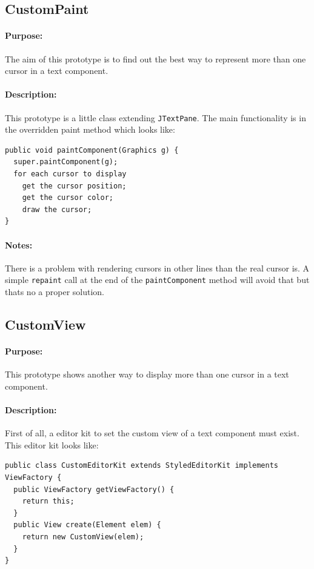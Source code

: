 \documentclass[11pt,a4paper]{article}
\begin{document}
\subsection{CustomPaint}
\paragraph{Purpose:}
The aim of this prototype is to find out the best way to represent more than one cursor in a text component.
\paragraph{Description:}
This prototype is a little class extending \texttt{JTextPane}. The main functionality is in the overridden paint method which looks like:
\begin{verbatim}
public void paintComponent(Graphics g) {
  super.paintComponent(g);
  for each cursor to display
    get the cursor position;
    get the cursor color;
    draw the cursor;
}
\end{verbatim}
\paragraph{Notes:}
There is a problem with rendering cursors in other lines than the real cursor is. A simple \texttt{repaint} call at the end of the \texttt{paintComponent} method will avoid that but thats no a proper solution.



\subsection{CustomView}
\paragraph{Purpose:}
This prototype shows another way to display more than one cursor in a text component.
\paragraph{Description:}

First of all, a editor kit to set the custom view of a text component must exist. This editor kit looks like:
\begin{verbatim}
public class CustomEditorKit extends StyledEditorKit implements ViewFactory {
  public ViewFactory getViewFactory() {
    return this;
  }
  public View create(Element elem) {
    return new CustomView(elem);
  }
}
\end{verbatim}
\end{document}

